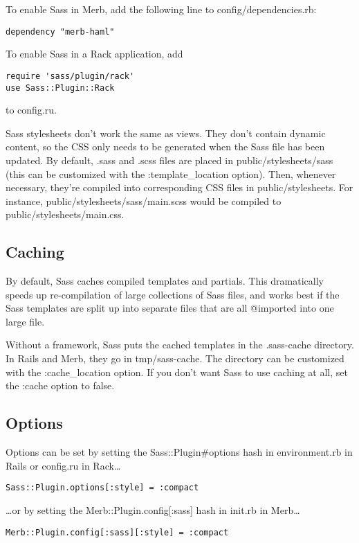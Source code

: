 \documentclass[10pt]{article}
\begin{document}
 To enable Sass in Merb, add the following line to config/dependencies.rb:
\begin{verbatim}
dependency "merb-haml"
\end{verbatim}


 To enable Sass in a Rack application, add
\begin{verbatim}
require 'sass/plugin/rack'
use Sass::Plugin::Rack
\end{verbatim}


 to config.ru.


 Sass stylesheets don’t work the same as views. They don’t contain dynamic content, so the CSS only needs to be generated when the Sass file has been updated. By default, .sass and .scss files are placed in public/stylesheets/sass (this can be customized with the :template\_location option). Then, whenever necessary, they’re compiled into corresponding CSS files in public/stylesheets. For instance, public/stylesheets/sass/main.scss would be compiled to public/stylesheets/main.css.
\subsection{Caching}


 By default, Sass caches compiled templates and partials. This dramatically speeds up re-compilation of large collections of Sass files, and works best if the Sass templates are split up into separate files that are all @imported into one large file.


 Without a framework, Sass puts the cached templates in the .sass-cache directory. In Rails and Merb, they go in tmp/sass-cache. The directory can be customized with the :cache\_location option. If you don’t want Sass to use caching at all, set the :cache option to false.
\subsection{Options}


 Options can be set by setting the Sass::Plugin\#options hash in environment.rb in Rails or config.ru in Rack…
\begin{verbatim}
Sass::Plugin.options[:style] = :compact
\end{verbatim}


 …or by setting the Merb::Plugin.config[:sass] hash in init.rb in Merb…
\begin{verbatim}
Merb::Plugin.config[:sass][:style] = :compact
\end{verbatim}
\end{document}
